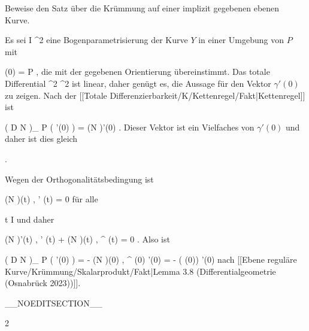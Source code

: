 {

Beweise den Satz über die Krümmung auf einer implizit gegebenen ebenen Kurve.

}
{

Es sei
\maabb {\gamma} { I } { \R^2
} {}
eine Bogenparametrisierung der Kurve $Y$ in einer Umgebung von $P$  mit

\mavergleichskette
{\vergleichskette
{ \gamma (0)
}
{ = }{ P
}
{  }{
}
{    }{
}
{   }{
}
}
{}{}{,}
die mit der gegebenen Orientierung übereinstimmt. Das totale Differential
 { \R^2} {\R^2
} {}
ist linear, daher genügt es, die Aussage für den Vektor $\gamma'(0)$ zu zeigen. Nach
der [[Totale Differenzierbarkeit/K/Kettenregel/Fakt|Kettenregel]]
ist

\mavergleichskettedisp
{\vergleichskette
{ \left(  D N   \right)_{ P } \left(   \gamma'(0)  \right)
}
{ =} { (N \circ \gamma )'(0)
}
{ } {
}
{ } {
}
{ } {
}
}
{}{}{.}
Dieser Vektor ist ein Vielfaches von $\gamma'(0)$ und daher ist dies gleich

 { . }

Wegen der Orthogonalitätsbedingung ist

\mavergleichskettedisp
{\vergleichskette
{ \left\langle  (N \circ  \gamma)(t) ,  \gamma' (t)   \right\rangle
}
{ =} { 0
}
{ } {
}
{ } {
}
{ } {
}
}
{}{}{}
für alle

\mavergleichskette
{\vergleichskette
{ t
}
{ \in }{ I
}
{  }{
}
{    }{
}
{   }{
}
}
{}{}{}
und daher

\mavergleichskettedisp
{\vergleichskette
{ \left\langle  (N \circ  \gamma)'(t) ,  \gamma' (t)   \right\rangle + \left\langle  (N \circ  \gamma)(t) ,  \gamma^{\prime \prime} (t)   \right\rangle
}
{ =} { 0
}
{ } {
}
{ } {
}
{ } {
}
}
{}{}{.}
Also ist

\mavergleichskettedisp
{\vergleichskette
{ \left(  D N   \right)_{ P } \left(   \gamma'(0)  \right)
}
{ =} { - \left\langle  (N \circ  \gamma)(0) ,  \gamma^{\prime \prime} (0)   \right\rangle  \gamma'(0)
}
{ =} { - \kappa( \gamma(0)) \gamma'(0)
}
{ } {
}
{ } {
}
}
{}{}{}
nach
[[Ebene reguläre Kurve/Krümmung/Skalarprodukt/Fakt|Lemma 3.8 (Differentialgeometrie (Osnabrück 2023))]].

 }

__NOEDITSECTION__

{2}


